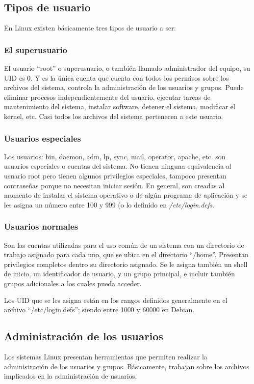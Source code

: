 \documentclass[letterpaper,10pt]{article}
\begin{document}
\subsection{Tipos de usuario}
En Linux existen básicamente tres tipos de usuario a ser:
\subsubsection{El superusuario}
El usuario ``root'' o superusuario, o también llamado administrador del equipo, su UID es 0. Y es la única 
cuenta que cuenta con todos los permisos sobre los archivos del sistema, controla la administración de los usuarios y grupos.
Puede eliminar procesos independientemente del usuario, ejecutar tareas de mantenimiento del sistema,
instalar software, detener el sistema, modificar el kernel, etc.
Casi todos los archivos del sistema pertenecen a este usuario.

\subsubsection{Usuarios especiales}
Los usuarios: bin, daemon, adm, lp, sync, mail, operator, apache, etc. son usuarios especiales o cuentas del sistema.
No tienen ninguna equivalencia al usuario root pero tienen algunos privilegios especiales, tampoco presentan
contraseñas porque no necesitan iniciar sesión. En general, son creadas al momento de instalar el sistema operativo
o de algún programa de aplicación y se les asigna un número entre 100 y 999 (o lo definido en \emph{/etc/login.defs}.

\subsubsection{Usuarios normales}
Son las cuentas utilizadas para el uso común de un sistema con un directorio de trabajo asignado
para cada uno, que se ubica en el directorio ``/home''. Presentan privilegios completos dentro su directorio 
asignado. Se le asigna también un shell de inicio, un identificador de usuario, y un grupo principal, e incluir también grupos
adicionales a los cuales pueda acceder.

Los UID que se les asigna están en los rangos definidos generalmente en el archivo ``/etc/login.defs''; siendo entre 1000 y 60000
en Debian.

\subsection{Administración de los usuarios}
Los sistemas Linux presentan herramientas que permiten realizar la administración de los usuarios y grupos.
Básicamente, trabajan sobre los archivos implicados en la administración de usuarios.
\end{document}

